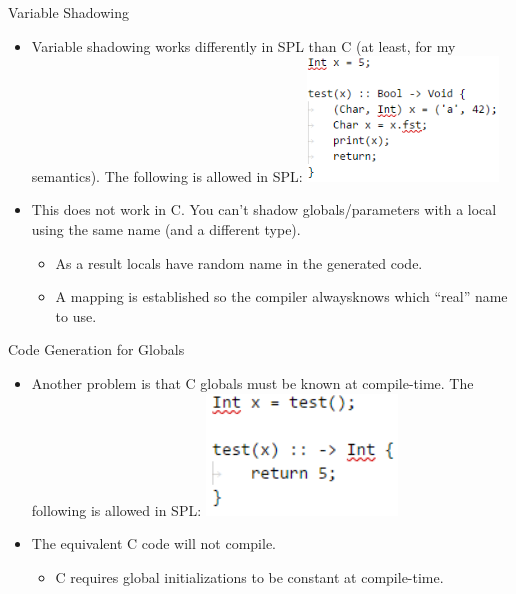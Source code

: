 \documentclass[10pt]{beamer}
\begin{document}
\begin{frame}{Variable Shadowing}
    \begin{itemize}
        \item Variable shadowing works differently in SPL than C (at least, for my semantics). The following is allowed in SPL:
        \includegraphics[width=0.4\textwidth]{presentation4/4.png}
        \item This does not work in C. You can't shadow globals/parameters with a local using the same name (and a different type).
        \begin{itemize}
            \item As a result locals have random name in the generated code.
            \item A mapping is established so the compiler always\footnotemark  knows which ``real'' name to use.
        \end{itemize}
    \end{itemize}
\end{frame}

\begin{frame}{Code Generation for Globals}
    \begin{itemize}
        \item Another problem is that C globals must be known at compile-time. The following is allowed in SPL:
        \includegraphics[width=0.4\textwidth]{presentation4/5.png}
        \item The equivalent C code will not compile.
        \begin{itemize}
            \item C requires global initializations to be constant at compile-time.
        \end{itemize}
    \end{itemize}
\end{frame}
\end{document}
